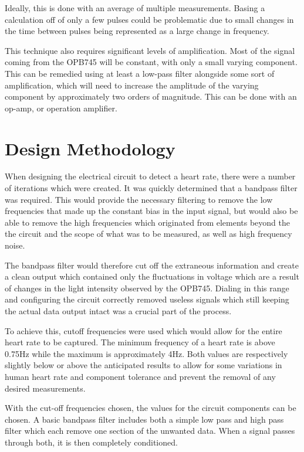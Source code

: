 \documentclass[conference]{IEEEtran}
\begin{document}
    Ideally, this is
    done with an average of multiple measurements. Basing a calculation off of
    only a few pulses could be problematic due to small changes in the time
    between pulses being represented as a large change in frequency. 
    
    This technique also requires significant levels of amplification. Most of
    the signal coming from the OPB745 will be constant, with only a small
    varying component. This can be remedied using at least a low-pass filter alongside
    some sort of amplification, which will need to increase the amplitude
    of the varying component by approximately two orders of magnitude. This can
    be done with an op-amp, or operation amplifier.

\section{Design Methodology}
    When designing the electrical circuit to detect a heart rate, 
    there were a number of iterations which were created. It was quickly
    determined that a bandpass filter was required. This would provide the
    necessary filtering to remove the low frequencies that made up the constant
    bias in the input signal, but would also be able to remove the high frequencies which 
    originated from elements beyond the the circuit and the scope of what was
    to be measured, as well as high frequency noise.

    The bandpass filter would therefore cut off the extraneous information and
    create a clean output which contained only the fluctuations in voltage
    which are a result of changes in the light intensity observed by the OPB745.
    Dialing in this range and configuring the circuit correctly removed
    useless signals which still keeping the actual data output intact was a
    crucial part of the process.

    To achieve this, cutoff frequencies were used which would allow for the
    entire heart rate to be captured. The minimum frequency of a heart rate is
    above 0.75Hz while the maximum is approximately 4Hz. Both values are
    respectively slightly below or above the anticipated results to allow for
    some variations in human heart rate and component tolerance and prevent
    the removal of any desired measurements.

    With the cut-off frequencies chosen, the values for the circuit components
    can be chosen. A basic bandpass filter includes both a
    simple low pass and high pass filter which each remove one section of the
    unwanted data. When a signal passes through both, it is then completely
    conditioned.
\end{document}

